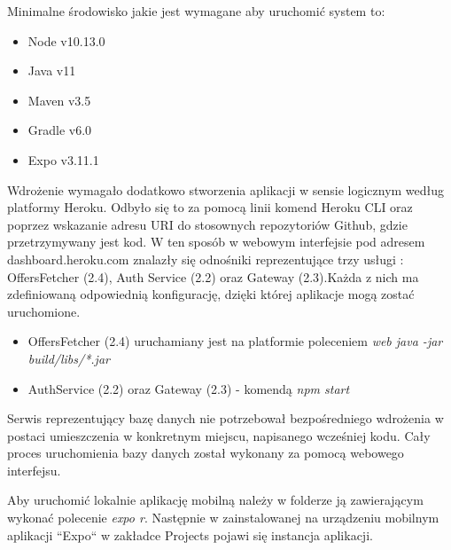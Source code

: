 \newpage
Minimalne środowisko jakie jest wymagane aby uruchomić system to:
\begin{itemize}
	\item Node v10.13.0
	\item Java v11
	\item Maven v3.5
	\item Gradle v6.0
	\item Expo v3.11.1
\end{itemize}

Wdrożenie wymagało dodatkowo stworzenia aplikacji w sensie logicznym według platformy Heroku. Odbyło się to za pomocą linii komend Heroku CLI oraz poprzez wskazanie adresu URI do stosownych repozytoriów Github, gdzie przetrzymywany jest kod.
W ten sposób w webowym interfejsie pod adresem dashboard.heroku.com znalazły się odnośniki reprezentujące trzy usługi : OffersFetcher (2.4), Auth Service (2.2) oraz Gateway (2.3).\newline Każda z nich ma zdefiniowaną odpowiednią konfigurację, dzięki której aplikacje mogą zostać uruchomione.
\begin{itemize}
	\item {OffersFetcher (2.4) uruchamiany jest na platformie poleceniem \textit{web java -jar build/libs/*.jar}}
	\item {AuthService (2.2) oraz Gateway (2.3) - komendą \textit{npm start}}
\end{itemize}

Serwis reprezentujący bazę danych nie potrzebował bezpośredniego wdrożenia w postaci umieszczenia w konkretnym miejscu, napisanego wcześniej kodu. Cały proces uruchomienia bazy danych został wykonany za pomocą webowego interfejsu.

Aby uruchomić lokalnie aplikację mobilną należy w folderze ją zawierającym wykonać polecenie \textit{expo r}. Następnie w zainstalowanej na urządzeniu mobilnym aplikacji ``Expo`` w zakładce Projects pojawi się instancja aplikacji.

